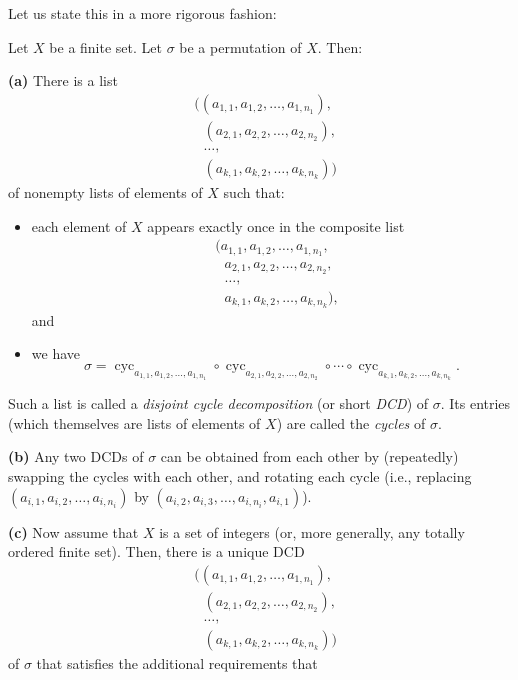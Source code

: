 Let us state this in a more rigorous fashion:

\begin{theorem}
\label{thm.perm.dcd.main}Let $X$
be a finite set. Let $\sigma$ be a permutation of $X$. Then: \medskip

\textbf{(a)} There is a list%
\begin{align*}
&  \Big(\left(  a_{1,1},a_{1,2},\ldots,a_{1,n_{1}}\right)  ,\\
&  \ \ \ \left(  a_{2,1},a_{2,2},\ldots,a_{2,n_{2}}\right)  ,\\
&  \ \ \ \ldots,\\
&  \ \ \ \left(  a_{k,1},a_{k,2},\ldots,a_{k,n_{k}}\right)  \Big)
\end{align*}
of nonempty lists of elements of $X$ such that:

\begin{itemize}
\item each element of $X$ appears exactly once in the composite list%
\begin{align*}
&  (a_{1,1},a_{1,2},\ldots,a_{1,n_{1}},\\
&  \ \ \ a_{2,1},a_{2,2},\ldots,a_{2,n_{2}},\\
&  \ \ \ \ldots,\\
&  \ \ \ a_{k,1},a_{k,2},\ldots,a_{k,n_{k}}),
\end{align*}
and

\item we have%
\[
\sigma=\operatorname*{cyc}\nolimits_{a_{1,1},a_{1,2},\ldots,a_{1,n_{1}}}%
\circ\operatorname*{cyc}\nolimits_{a_{2,1},a_{2,2},\ldots,a_{2,n_{2}}}%
\circ\cdots\circ\operatorname*{cyc}\nolimits_{a_{k,1},a_{k,2},\ldots
,a_{k,n_{k}}}.
\]

\end{itemize}

Such a list is called a \emph{disjoint cycle decomposition} (or short
\emph{DCD}) of $\sigma$. Its entries (which themselves are lists of elements
of $X$) are called the \emph{cycles} of $\sigma$. \medskip

\textbf{(b)} Any two DCDs of $\sigma$ can be obtained from each other by
(repeatedly) swapping the cycles with each other, and rotating each cycle
(i.e., replacing $\left(  a_{i,1},a_{i,2},\ldots,a_{i,n_{i}}\right)  $ by
$\left(  a_{i,2},a_{i,3},\ldots,a_{i,n_{i}},a_{i,1}\right)  $). \medskip

\textbf{(c)} Now assume that $X$ is a set of integers (or, more generally, any
totally ordered finite set). Then, there is a unique DCD
\begin{align*}
&  \Big(\left(  a_{1,1},a_{1,2},\ldots,a_{1,n_{1}}\right)  ,\\
&  \ \ \ \left(  a_{2,1},a_{2,2},\ldots,a_{2,n_{2}}\right)  ,\\
&  \ \ \ \ldots,\\
&  \ \ \ \left(  a_{k,1},a_{k,2},\ldots,a_{k,n_{k}}\right)  \Big)
\end{align*}
of $\sigma$ that satisfies the additional requirements that


\end{theorem}
